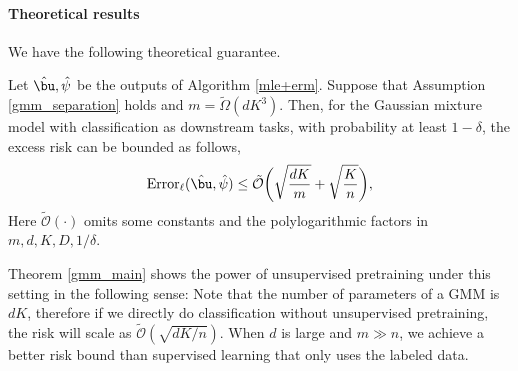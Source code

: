 

\paragraph{Theoretical results}
We have the following theoretical guarantee.
\begin{theorem}\label{gmm_main}
Let $\hat\bu,\hat\psi$ be the outputs of Algorithm \ref{mle+erm}. Suppose that Assumption \ref{gmm_separation} holds and $m=\tilde{\Omega}(dK^3)$. Then, for the Gaussian mixture model with classification as downstream tasks, with probability at least $1-\delta$, the excess risk can be bounded as follows,
\begin{equation*}
{\rm Error}_{\ell}(\hat\bu,\hat\psi)\leq\tilde{\mathcal{O}}\bigg(\sqrt{\frac{dK}{m}}+\sqrt{\frac{K}{n}}\bigg),
\end{equation*}
Here $\tilde{\mathcal{O}}(\cdot)$ omits some constants and the polylogarithmic factors in $m, d, K, D, 1/\delta$.
\end{theorem}

Theorem \ref{gmm_main} shows the power of unsupervised pretraining under this setting in the following sense: Note that the number of parameters of a GMM is $dK$, therefore if we directly do classification without unsupervised pretraining, the risk will scale as $\tilde{\mathcal{O}}(\sqrt{dK/n})$. When $d$ is large and $m \gg n$, we achieve a better risk bound than supervised learning that only uses the labeled data.

